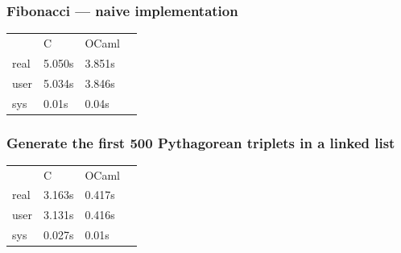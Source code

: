 \documentclass[aspectratio=169]{beamer}
\begin{document}


\begin{frame}
  \frametitle{Fibonacci --- naive implementation}
  \begin{table}
    \centering
    \begin{tabular}{llll}
           & C      & OCaml  & \\
      real & 5.050s & 3.851s & \\
      user & 5.034s & 3.846s & \\
      sys  & 0.01s  & 0.04s  &
    \end{tabular}
  \end{table}
\end{frame}

\begin{frame}
  \frametitle{Generate the first 500 Pythagorean triplets in a linked list}
  \begin{table}
    \centering
    \begin{tabular}{llll}
           & C      & OCaml  & \\
      real & 3.163s & 0.417s & \\
      user & 3.131s & 0.416s & \\
      sys  & 0.027s & 0.01s  &
    \end{tabular}
  \end{table}
\end{frame}
\end{document}
